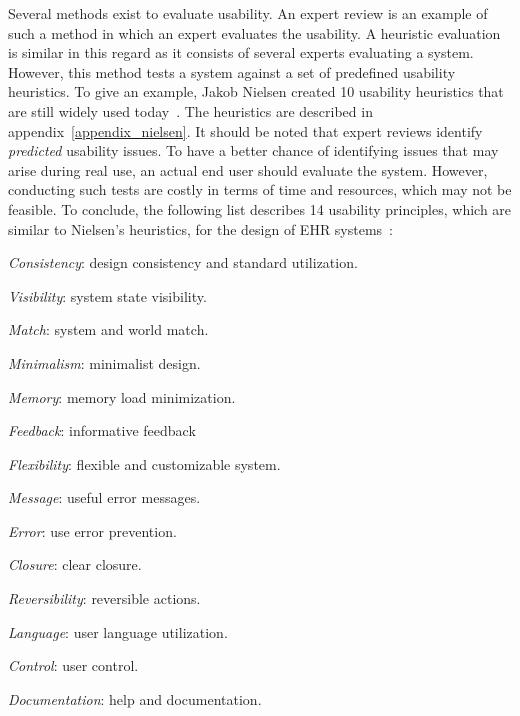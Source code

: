     Several methods exist to evaluate usability. An expert review is an example of such a method in which an expert evaluates the usability. A heuristic evaluation is similar in this regard as it consists of several experts evaluating a system. However, this method tests a system against a set of predefined usability heuristics. To give an example, Jakob Nielsen created 10 usability heuristics that are still widely used today~\cite{Nielsen1993}. The heuristics are described in appendix~\ref{appendix_nielsen}. It should be noted that expert reviews identify \emph{predicted} usability issues. To have a better chance of identifying issues that may arise during real use, an actual end user should evaluate the system. However, conducting such tests are costly in terms of time and resources, which may not be feasible. To conclude, the following list describes 14 usability principles, which are similar to Nielsen's heuristics, for the design of EHR systems~\cite{Middleton2013}:
    \begin{multicols}{2}
        \begin{myenumerate}
            \item \emph{Consistency}: design consistency and standard utilization.
            \item \emph{Visibility}: system state visibility.
            \item \emph{Match}: system and world match.
            \item \emph{Minimalism}: minimalist design.
            \item \emph{Memory}: memory load minimization.
            \item \emph{Feedback}: informative feedback
            \item \emph{Flexibility}: flexible and customizable system.
            \item \emph{Message}: useful error messages.
            \item \emph{Error}: use error prevention.
            \item \emph{Closure}: clear closure.
            \item \emph{Reversibility}: reversible actions.
            \item \emph{Language}: user language utilization.
            \item \emph{Control}: user control.
            \item \emph{Documentation}: help and documentation.
        \end{myenumerate}
    \end{multicols}

